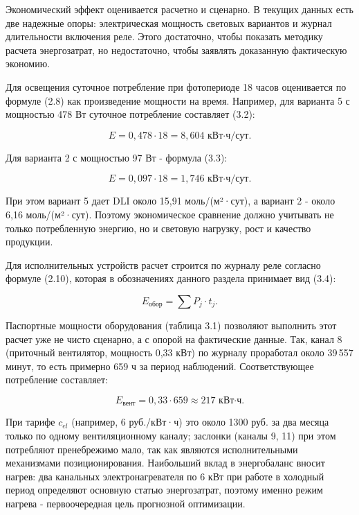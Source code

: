 \documentclass[a4paper,14pt]{extarticle}
\begin{document}
Экономический эффект оценивается расчетно и сценарно. В текущих данных
есть две надежные опоры: электрическая мощность световых вариантов и
журнал длительности включения реле. Этого достаточно, чтобы показать
методику расчета энергозатрат, но недостаточно, чтобы заявлять
доказанную фактическую экономию.

Для освещения суточное потребление при фотопериоде 18 часов оценивается
по формуле (2.8) как произведение мощности на время. Например, для
варианта 5 с мощностью 478 Вт суточное потребление составляет (3.2):

\begin{equation}
E = 0{,}478 \cdot 18 = 8{,}604 \text{ кВт·ч/сут}.
\tag{3.2}
\end{equation}

Для варианта 2 с мощностью 97 Вт - формула (3.3):

\begin{equation}
E = 0{,}097 \cdot 18 = 1{,}746 \text{ кВт·ч/сут}.
\tag{3.3}
\end{equation}

При этом вариант 5 дает DLI около 15,91 моль/(м²·сут), а вариант 2 -
около 6,16 моль/(м²·сут). Поэтому экономическое сравнение должно
учитывать не только потребленную энергию, но и световую нагрузку, рост и
качество продукции.

Для исполнительных устройств расчет строится по журналу реле согласно
формуле (2.10), которая в обозначениях данного раздела принимает вид
(3.4):

\begin{equation}
E_{\text{обор}} = \sum P_j \cdot t_j.
\tag{3.4}
\end{equation}

Паспортные мощности оборудования (таблица 3.1) позволяют выполнить этот
расчет уже не чисто сценарно, а с опорой на фактические данные. Так,
канал 8 (приточный вентилятор, мощность 0,33 кВт) по журналу проработал
около 39\,557 минут, то есть примерно 659 ч за период наблюдений.
Соответствующее потребление составляет:

\begin{equation}
E_{\text{вент}} = 0{,}33 \cdot 659 \approx 217 \text{ кВт·ч}.
\tag{3.5}
\end{equation}

При тарифе \(c_{el}\) (например, 6 руб./кВт·ч) это около 1300 руб. за
два месяца только по одному вентиляционному каналу; заслонки (каналы 9,
11) при этом потребляют пренебрежимо мало, так как являются
исполнительными механизмами позиционирования. Наибольший вклад в
энергобаланс вносит нагрев: два канальных электронагревателя по 6 кВт
при работе в холодный период определяют основную статью энергозатрат,
поэтому именно режим нагрева - первоочередная цель прогнозной
оптимизации.
\end{document}
